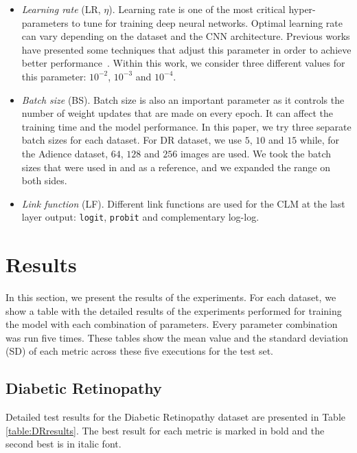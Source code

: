 \documentclass[journal]{IEEEtran}
\begin{document}
	\begin{itemize}
		\item \textit{Learning rate} (LR, $\eta$). Learning rate is one of the most critical hyper-parameters to tune for training deep neural networks. Optimal learning rate can vary depending on the dataset and the CNN architecture. Previous works have presented some techniques that adjust this parameter in order to achieve better performance~\cite{smith2017cyclical,senior2013empirical}. Within this work, we consider three different values for this parameter: $10^{-2}$, $10^{-3}$ and $10^{-4}$.
		\item \textit{Batch size} (BS). Batch size is also an important parameter as it controls the number of weight updates that are made on every epoch. It can affect the training time and the model performance. In this paper, we try three separate batch sizes for each dataset. For DR dataset, we use $5$, $10$ and $15$ while, for the Adience dataset, $64$, $128$ and $256$ images are used. We took the batch sizes that were used in \cite{de2018weighted} and \cite{beckham2017unimodal} as a reference, and we expanded the range on both sides.
		\item \textit{Link function} (LF). Different link functions are used for the CLM at the last layer output: \texttt{logit}, \texttt{probit} and complementary log-log.
	\end{itemize}
	
	\section{Results}
	\label{sect:results}
	In this section, we present the results of the experiments. For each dataset, we show a table with the detailed results of the experiments performed for training the model with each combination of parameters. Every parameter combination was run five times. These tables show the mean value and the standard deviation (SD) of each metric across these five executions for the test set.
	
	\subsection{Diabetic Retinopathy}
	\label{sect:dr}
	Detailed test results for the Diabetic Retinopathy dataset are presented in Table \ref{table:DRresults}. The best result for each metric is marked in bold and the second best is in italic font.
	
\end{document}
